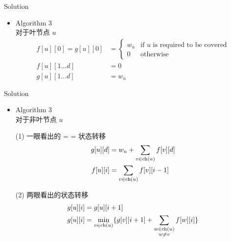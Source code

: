 \documentclass[UTF8]{beamer}
\begin{document}
\begin{frame}{Solution}

\begin{itemize}
    \item Algorithm 3 \\
        对于叶节点 $u$
        \begin{equation*}\begin{split}
            f[u][0] = g[u][0] &=
            \begin{cases}
                w_u &\mbox{if $u$ is required to be covered} \\
                0   &\mbox{otherwise}
            \end{cases} \\
            f[u][1 \dots d] &= 0 \\
            g[u][1 \dots d] &= w_u
        \end{split}\end{equation*}
\end{itemize}

\end{frame}

\begin{frame}{Solution}

\begin{itemize}
    \item Algorithm 3 \\
        对于非叶节点 $u$

        (1) 一眼看出的 = = 状态转移
        \begin{equation*}\begin{split}
            g[u][d] &= w_u + \sum_{v \in {\rm ch}(u)} f[v][d] \\
            f[u][i] &= \sum_{v \in {\rm ch}(u)} f[v][i - 1]
        \end{split}\end{equation*}

        \pause
        (2) 两眼看出的状态转移
        \begin{equation*}\begin{split}
            g[u][i] &= g[u][i + 1] \\
            g[u][i] &= \min_{v \in {\rm ch}(u)}
                \{g[v][i + 1] + \sum_{\substack{w \in {\rm ch}(u) \\ w \neq v}} f[w][i]\} \\
        \end{split}\end{equation*}
\end{itemize}

\end{frame}
\end{document}
